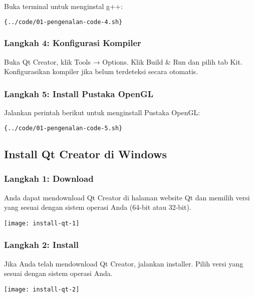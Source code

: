 Buka terminal untuk menginstal g++:

\begin{lstlisting}[language=sh]{../code/01-pengenalan-code-4.sh}
\end{lstlisting}

\subsubsection{Langkah 4: Konfigurasi Kompiler}

Buka Qt Creator, klik Tools → Options. Klik Build \& Run dan pilih tab Kit. Konfigurasikan kompiler jika belum terdeteksi secara otomatis.

\subsubsection{Langkah 5: Install Pustaka OpenGL}

Jalankan perintah berikut untuk menginstall Pustaka OpenGL:

\begin{lstlisting}[language=sh]{../code/01-pengenalan-code-5.sh}
\end{lstlisting}

\subsection{Install Qt Creator di Windows}

\subsubsection{Langkah 1: Download}

Anda dapat mendownload Qt Creator di halaman website Qt dan memilih versi yang sesuai dengan sistem operasi Anda (64-bit atau 32-bit).
 
\begin{center}
	 \texttt{[image: install-qt-1]}
\end{center}
 
\subsubsection{Langkah 2: Install}

Jika Anda telah mendownload Qt Creator, jalankan installer. Pilih versi yang sesuai dengan sistem operasi Anda.

\begin{center}
	 \texttt{[image: install-qt-2]}
\end{center}
 
